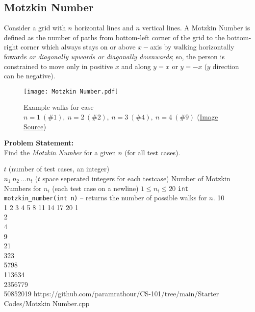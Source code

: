 \subsection{Motzkin Number}{\label{pp:motzkinnumber}}
Consider a grid with $n$ horizontal lines and $n$ vertical lines. A Motzkin Number is defined as the number of paths from bottom-left corner of the grid to the bottom-right corner which always stays on or above $x-$axis by walking horizontally fowards \emph{or diagonally upwards or diagonally downwards}; so, the person is constrained to move only in positive $x$ and along $y=x$ or $y=-x$ ($y$ direction can be negative).
\begin{figure}[H]
	\centering
	\texttt{[image: Motzkin Number.pdf]}
	\caption{Example walks for case $n=1\ (\#1),\ n=2\ (\#2),\ n=3\ (\#4),\ n=4\ (\#9)$ (\href{https://mathworld.wolfram.com/MotzkinNumber.html}{Image Source})}
	\label{fig:motzkinnumber}
\end{figure}
\vspace{-1em}
\textbf{Problem Statement:}\\
Find the \emph{Motzkin Number} for a given $n$ (for all test cases).
\begin{testcasesFunction}
	{$t$ \hfill(number of test cases, an integer)\\
	$n_1\ n_2\ \ldots n_t$ \hfill($t$ space seperated integers for each testcase)}
	{Number of Motzkin Numbers for $n_i$  \hfill(each test case on a newline)}
	{$1 \leq n_i \leq 20$}
	{\texttt{int motzkin\_number(int n)} -- returns the number of possible walks for $n$.}
	{10\\1 2 3 4 5 8 11 14 17 20}
	{1\\2\\4\\9\\21\\323\\5798\\113634\\2356779\\50852019}
	{https://github.com/paramrathour/CS-101/tree/main/Starter Codes/Motzkin Number.cpp}
\end{testcasesFunction}
